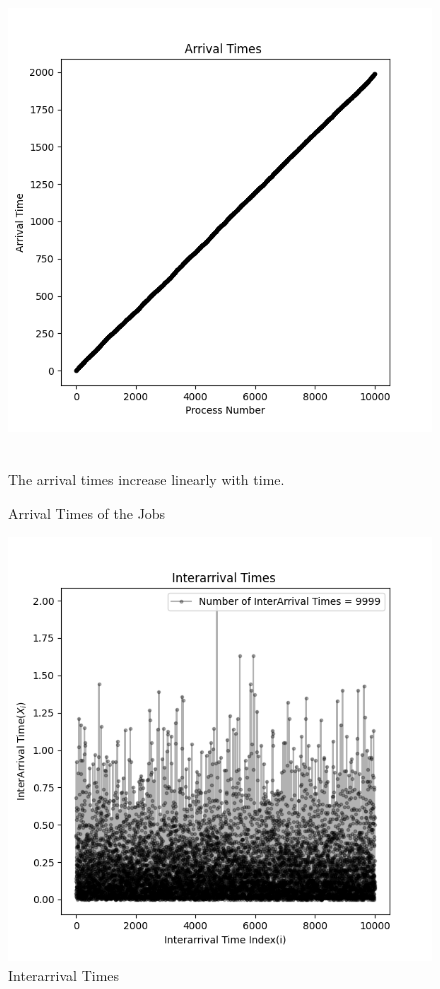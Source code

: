 \documentclass{beamer}
\begin{document}
\begin{frame}
\begin{figure}
    \centering
    \includegraphics[width=0.75\linewidth]{images/arrival_times.png}
    \caption{Arrival Times of the Jobs}
    \label{Arrival Times of the Jobs}
    \\
The arrival times increase linearly with time.\\
\end{figure}
\end{frame}

\begin{frame}
\begin{figure}
    \centering
    \includegraphics[width=0.75\linewidth]{images/interarrival1.png}
    \caption{Interarrival Times}
    \label{Arrival Times of the Jobs}
\end{figure}
\end{frame}
\end{document}
